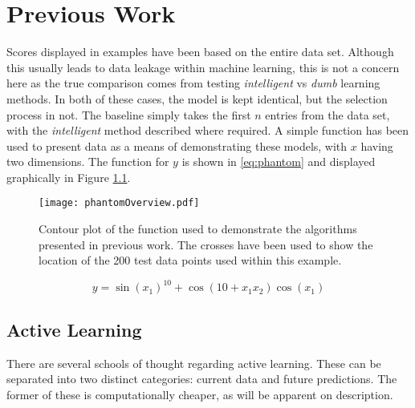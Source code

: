
\chapter{Previous Work}


\graphicspath{{Chapter2/Figs/Vector/}{Chapter2/Figs/Raster/}}


Scores displayed in examples have been based on the entire data set. Although this usually leads to data leakage within machine learning, this is not a concern here as the true comparison comes from testing  \textit{intelligent} vs \textit{dumb} learning methods. In both of these cases, the model is kept identical, but the selection process in not. The baseline simply takes the first $n$ entries from the data set, with the \textit{intelligent} method described where required. A simple function has been used to present data as a means of demonstrating these models, with $x$ having two dimensions. The function for $y$ is shown in \ref{eq:phantom} and displayed graphically in Figure \ref{fig:phantom}.


\begin{figure}[H]
  \begin{center}
    \texttt{[image: phantomOverview.pdf]}
    \caption{Contour plot of the function used to demonstrate the algorithms presented in previous work. The crosses have been used to show the location of the 200 test data points used within this example.}
    \label{fig:phantom}
  \end{center}
\end{figure}

\begin{equation}
  y = \sin{(x_1)}^{10} + \cos{(10 + x_1 x_2)}\cos{(x_1)}
  \label{eq:phantom}
\end{equation}

\section{Active Learning}
\label{ch:Active Learning}

There are several schools of thought regarding active learning. These can be separated into two distinct categories: current data and future predictions. The former of these is computationally cheaper, as will be apparent on description.


